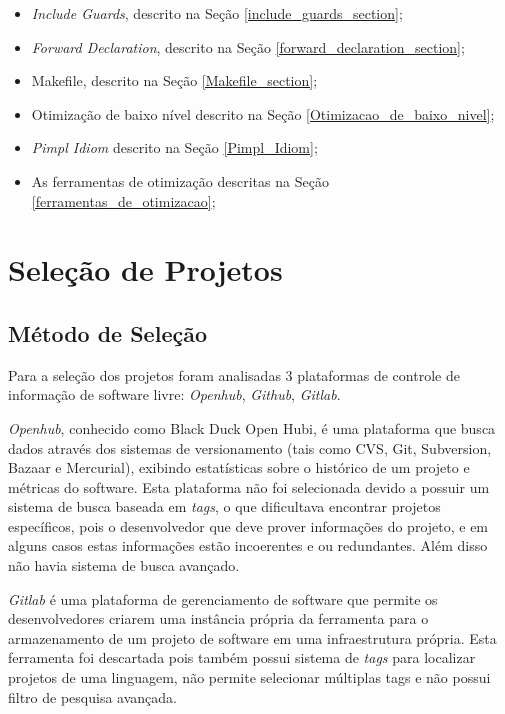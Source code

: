 \begin{itemize}
	\item \textit{Include Guards}, descrito na Seção
 \ref{include_guards_section};
	\item \textit{Forward Declaration}, descrito na Seção
 \ref{forward_declaration_section};
	\item Makefile, descrito na Seção
 \ref{Makefile_section};
	\item Otimização de baixo nível descrito na Seção
 \ref{Otimizacao_de_baixo_nivel};
	\item \textit{Pimpl Idiom} descrito na Seção
 \ref{Pimpl_Idiom};
	\item As ferramentas de otimização descritas na Seção
 \ref{ferramentas_de_otimizacao};
\end{itemize}

\section{Seleção de Projetos}

\subsection{Método de Seleção}

Para a seleção dos projetos foram analisadas 3 plataformas de controle de informação
de software livre: \textit{Openhub}, \textit{Github}, \textit{Gitlab}.

\textit{Openhub}, conhecido como Black Duck Open Hubi, é uma plataforma que busca dados através
 dos sistemas de versionamento (tais como CVS, Git, Subversion, Bazaar e Mercurial),
 exibindo estatísticas sobre o histórico de um projeto e métricas do software.
 Esta plataforma não foi selecionada devido a possuir um sistema de busca baseada em \textit{tags},
 o que dificultava encontrar projetos específicos, pois o desenvolvedor que deve prover
 informações do projeto, e em alguns casos estas informações estão incoerentes e ou
 redundantes. Além disso não havia sistema de busca avançado.

\textit{Gitlab} é uma plataforma de gerenciamento de software que permite os
 desenvolvedores criarem uma instância própria da ferramenta para o armazenamento
 de um projeto de software em uma infraestrutura própria. Esta ferramenta foi
 descartada pois também possui sistema de \textit{tags} para localizar projetos de uma linguagem,
não permite selecionar múltiplas tags e não possui filtro de pesquisa avançada.

